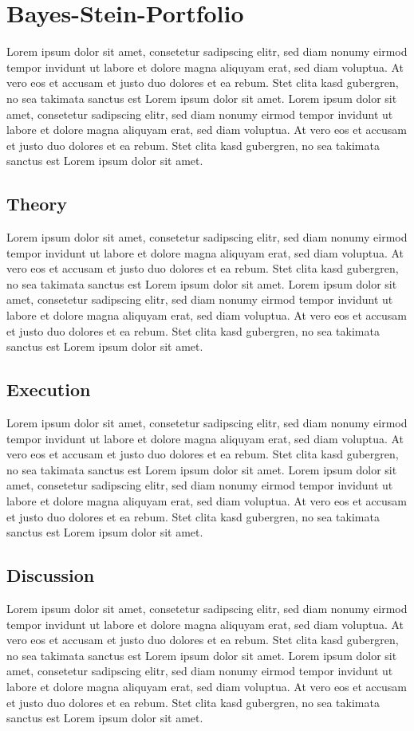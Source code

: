 \section{Bayes-Stein-Portfolio}
Lorem ipsum dolor sit amet, consetetur sadipscing elitr, sed diam nonumy eirmod tempor invidunt ut labore et dolore magna aliquyam erat, sed diam voluptua. At vero eos et accusam et justo duo dolores et ea rebum. Stet clita kasd gubergren, no sea takimata sanctus est Lorem ipsum dolor sit amet. Lorem ipsum dolor sit amet, consetetur sadipscing elitr, sed diam nonumy eirmod tempor invidunt ut labore et dolore magna aliquyam erat, sed diam voluptua. At vero eos et accusam et justo duo dolores et ea rebum. Stet clita kasd gubergren, no sea takimata sanctus est Lorem ipsum dolor sit amet.
\subsection{Theory}
Lorem ipsum dolor sit amet, consetetur sadipscing elitr, sed diam nonumy eirmod tempor invidunt ut labore et dolore magna aliquyam erat, sed diam voluptua. At vero eos et accusam et justo duo dolores et ea rebum. Stet clita kasd gubergren, no sea takimata sanctus est Lorem ipsum dolor sit amet. Lorem ipsum dolor sit amet, consetetur sadipscing elitr, sed diam nonumy eirmod tempor invidunt ut labore et dolore magna aliquyam erat, sed diam voluptua. At vero eos et accusam et justo duo dolores et ea rebum. Stet clita kasd gubergren, no sea takimata sanctus est Lorem ipsum dolor sit amet.
\subsection{Execution}
Lorem ipsum dolor sit amet, consetetur sadipscing elitr, sed diam nonumy eirmod tempor invidunt ut labore et dolore magna aliquyam erat, sed diam voluptua. At vero eos et accusam et justo duo dolores et ea rebum. Stet clita kasd gubergren, no sea takimata sanctus est Lorem ipsum dolor sit amet. Lorem ipsum dolor sit amet, consetetur sadipscing elitr, sed diam nonumy eirmod tempor invidunt ut labore et dolore magna aliquyam erat, sed diam voluptua. At vero eos et accusam et justo duo dolores et ea rebum. Stet clita kasd gubergren, no sea takimata sanctus est Lorem ipsum dolor sit amet.
\subsection{Discussion}
Lorem ipsum dolor sit amet, consetetur sadipscing elitr, sed diam nonumy eirmod tempor invidunt ut labore et dolore magna aliquyam erat, sed diam voluptua. At vero eos et accusam et justo duo dolores et ea rebum. Stet clita kasd gubergren, no sea takimata sanctus est Lorem ipsum dolor sit amet. Lorem ipsum dolor sit amet, consetetur sadipscing elitr, sed diam nonumy eirmod tempor invidunt ut labore et dolore magna aliquyam erat, sed diam voluptua. At vero eos et accusam et justo duo dolores et ea rebum. Stet clita kasd gubergren, no sea takimata sanctus est Lorem ipsum dolor sit amet.

